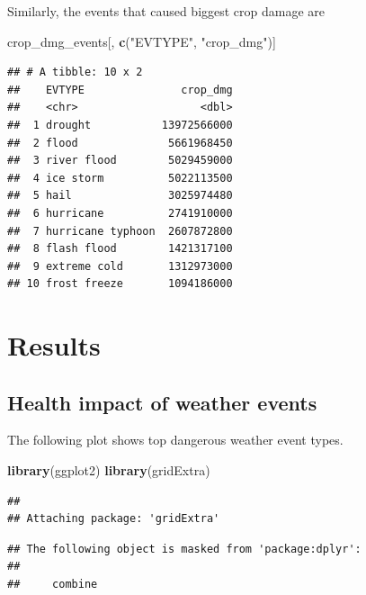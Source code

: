 \documentclass[]{article}
\newenvironment{Shaded}{\begin{snugshade}}{\end{snugshade}}
\newcommand{\KeywordTok}[1]{\textcolor[rgb]{0.13,0.29,0.53}{\textbf{#1}}}
\newcommand{\StringTok}[1]{\textcolor[rgb]{0.31,0.60,0.02}{#1}}
\newcommand{\NormalTok}[1]{#1}
\begin{document}
Similarly, the events that caused biggest crop damage are

\begin{Shaded}
\begin{Highlighting}[]
\NormalTok{crop_dmg_events[, }\KeywordTok{c}\NormalTok{(}\StringTok{"EVTYPE"}\NormalTok{, }\StringTok{"crop_dmg"}\NormalTok{)]}
\end{Highlighting}
\end{Shaded}

\begin{verbatim}
## # A tibble: 10 x 2
##    EVTYPE               crop_dmg
##    <chr>                   <dbl>
##  1 drought           13972566000
##  2 flood              5661968450
##  3 river flood        5029459000
##  4 ice storm          5022113500
##  5 hail               3025974480
##  6 hurricane          2741910000
##  7 hurricane typhoon  2607872800
##  8 flash flood        1421317100
##  9 extreme cold       1312973000
## 10 frost freeze       1094186000
\end{verbatim}

\section{Results}\label{results}

\subsection{Health impact of weather
events}\label{health-impact-of-weather-events}

The following plot shows top dangerous weather event types.

\begin{Shaded}
\begin{Highlighting}[]
\KeywordTok{library}\NormalTok{(ggplot2)}
\KeywordTok{library}\NormalTok{(gridExtra)}
\end{Highlighting}
\end{Shaded}

\begin{verbatim}
## 
## Attaching package: 'gridExtra'
\end{verbatim}

\begin{verbatim}
## The following object is masked from 'package:dplyr':
## 
##     combine
\end{verbatim}
\end{document}
